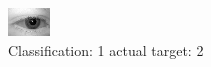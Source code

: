 \begin{figure}[h!]
\begin{center}
\includegraphics[width=0.60\columnwidth]{figures/ID497_class_1_target_2.png}
\end{center}
\caption{ Classification: 1 actual target: 2}
\label{fig:ID497_class_1_target_2}
\end{figure}

